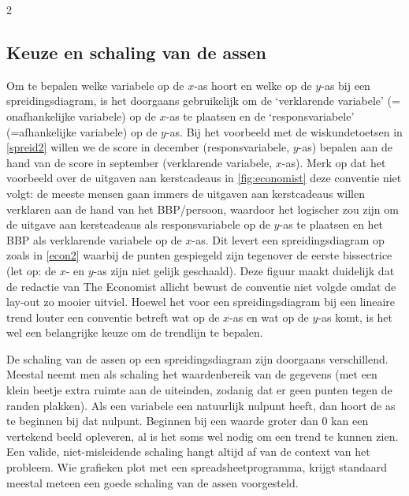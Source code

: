 \begin{multicols}{2}
\subsection{Keuze en schaling van de assen}
Om te bepalen welke variabele op de $x$-as hoort en welke op de $y$-as bij een spreidingsdiagram, is het doorgaans gebruikelijk om de `verklarende variabele' (= onafhankelijke variabele) op de $x$-as te plaatsen en de `responsvariabele' (=afhankelijke variabele) op de $y$-as. Bij het voorbeeld met de wiskundetoetsen in \autoref{spreid2} willen we de score in december (responsvariabele, $y$-as) bepalen aan de hand van de score in september (verklarende variabele, $x$-as). 
Merk op dat het voorbeeld over de uitgaven aan kerstcadeaus in \autoref{fig:economist} deze conventie niet volgt: de meeste mensen gaan immers de uitgaven aan kerstcadeaus willen verklaren aan de hand van het BBP/persoon, waardoor het logischer zou zijn om de uitgave aan kerstcadeaus als responsvariabele op de $y$-as te plaatsen en het BBP als verklarende variabele op de $x$-as. Dit levert een spreidingsdiagram op zoals in \autoref{econ2} waarbij de punten gespiegeld zijn tegenover de eerste bissectrice (let op: de $x$- en $y$-as zijn niet gelijk geschaald). Deze figuur maakt duidelijk dat de redactie van The Economist allicht bewust de conventie niet volgde omdat de lay-out zo mooier uitviel. Hoewel het voor een spreidingsdiagram bij een lineaire trend louter een conventie betreft wat op de $x$-as en wat op de $y$-as komt, is het wel een belangrijke keuze om de trendlijn te bepalen.

De schaling van de assen op een spreidingsdiagram zijn doorgaans verschillend. Meestal neemt men als schaling het waardenbereik van de gegevens (met een klein beetje extra ruimte aan de uiteinden, zodanig dat er geen punten tegen de randen plakken).  Als een variabele een natuurlijk nulpunt heeft, dan hoort de as te beginnen bij dat nulpunt. Beginnen bij een waarde groter dan 0 kan een vertekend beeld opleveren, al is het soms wel nodig om een trend te kunnen zien. Een valide, niet-misleidende schaling hangt altijd af van de context van het probleem.  Wie grafieken plot met een spreadsheetprogramma, krijgt standaard meestal meteen een goede schaling van de assen voorgesteld. 



\end{multicols}
